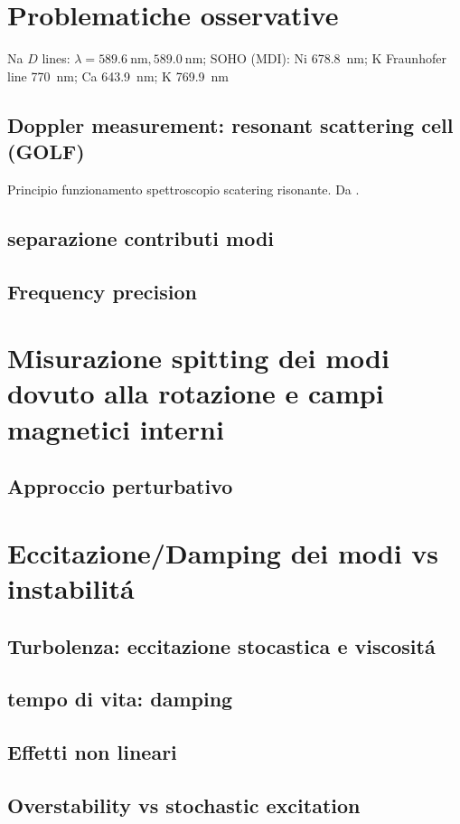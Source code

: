 \documentclass[../main.tex]{subfiles}
\begin{document}
\begin{refsection}

\nocite{*}
\begingroup
\let\clearpage\relax
\printbibliography
\endgroup

\section{Problematiche osservative}

Na $D$ lines: $\lambda=\SI{589.6}{\nano\meter},\SI{589.0}{\nano\meter}$; SOHO (MDI): Ni \SI{678.8}{\nano\meter}; K Fraunhofer line \SI{770}{\nano\meter}; Ca \SI{643.9}{\nano\meter}; K \SI{769.9}{\nano\meter}

\subsection{Doppler measurement: resonant scattering cell (GOLF)}

Principio funzionamento spettroscopio scatering risonante. Da \cite{brookes1978resonant}.

\subsection{separazione contributi modi}
\subsection{Frequency precision}

\section{Misurazione spitting dei modi dovuto alla rotazione e campi magnetici interni}

\subsection{Approccio perturbativo}

\section{Eccitazione/Damping dei modi vs instabilit\'a}

\subsection{Turbolenza: eccitazione stocastica e viscosit\'a}
\subsection{tempo di vita: damping}
\subsection{Effetti non lineari}
\subsection{Overstability vs stochastic excitation}



\end{refsection}
\end{document}
